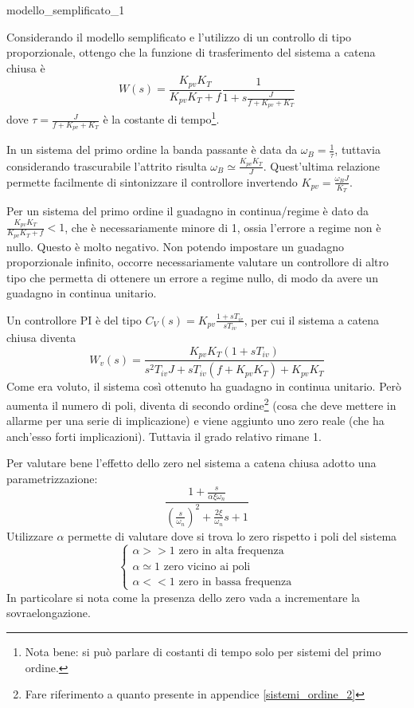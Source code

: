 {modello_semplificato_1}

Considerando il modello semplificato e l'utilizzo di un controllo di tipo proporzionale, ottengo che la funzione di trasferimento del sistema a catena chiusa è 
\[W(s)=\frac{K_{pv}K_T}{K_{pv}K_T+f}\frac{1}{1+s\frac{J}{f+K_{pv}+K_T}}\]
dove \(\tau = \frac{J}{f+K_{pv}+K_T}\) è la costante di tempo\footnote{Nota bene: si può parlare di costanti di tempo solo per sistemi del primo ordine.}.

In un sistema del primo ordine la banda passante è data da \(\omega_B=\frac{1}{\tau}\), tuttavia considerando trascurabile l'attrito risulta \(\omega_B\simeq \frac{K_{pv}K_T}{J}\). Quest'ultima relazione permette facilmente di sintonizzare il controllore invertendo \(K_{pv}=\frac{\omega_B J}{K_T}\).

Per un sistema del primo ordine il guadagno in continua/regime è dato da \(\frac{K_{pv}K_T}{K_{pv}K_T+f}<1\), che è necessariamente minore di 1, ossia l'errore a regime non è nullo. Questo è molto negativo. Non potendo impostare un guadagno proporzionale infinito, occorre necessariamente valutare un controllore di altro tipo che permetta di ottenere un errore a regime nullo, di modo da avere un guadagno in continua unitario.

Un controllore PI è del tipo \(C_V(s)=K_{pv}\frac{1+sT_{iv}}{sT_{iv}}\), per cui il sistema a catena chiusa diventa 
\[W_v(s)=\frac{K_{pv}K_T(1+sT_{iv})}{s^2T_{iv}J + sT_{iv}(f+K_{pv}K_T)+K_{pv}K_T}\]
Come era voluto, il sistema così ottenuto ha guadagno in continua unitario.
Però aumenta il numero di poli, diventa di secondo ordine\footnote{Fare riferimento a quanto presente in appendice \ref{sistemi_ordine_2}} (cosa che deve mettere in allarme per una serie di implicazione) e viene aggiunto uno zero reale (che ha anch'esso forti implicazioni). Tuttavia il grado relativo rimane 1.

Per valutare bene l'effetto dello zero nel sistema a catena chiusa adotto una parametrizzazione:
\[\frac{1+\frac{s}{\alpha \xi \omega_n}}{\left(\frac{s}{\omega_n}\right)^2+\frac{2\xi}{\omega_n}s+1}\]
Utilizzare \(\alpha\) permette di valutare dove si trova lo zero rispetto i poli del sistema
\[
\begin{cases}
\alpha >> 1 \text{ \ zero in alta frequenza} \\
\alpha \simeq 1 \text{ \ zero vicino ai poli} \\
\alpha << 1 \text{ \ zero in bassa frequenza}
\end{cases}
\]
In particolare si nota come la presenza dello zero vada a incrementare la sovraelongazione.

